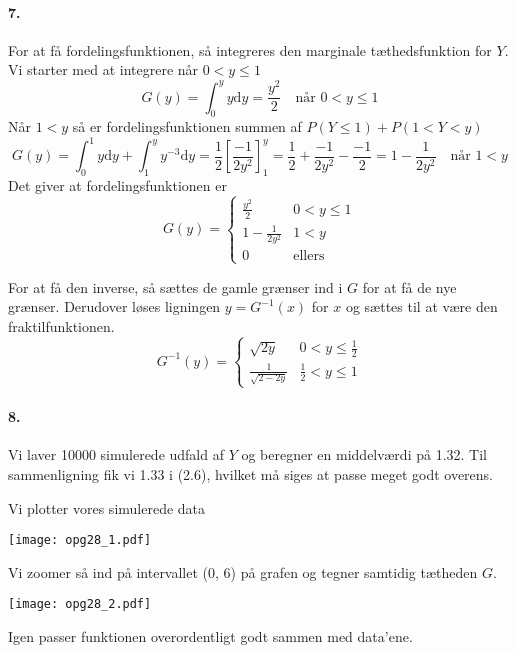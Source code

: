\documentclass[12pt]{article}
\begin{document}
\paragraph{7.}
For at få fordelingsfunktionen, så integreres den marginale tæthedsfunktion for $Y$.
Vi starter med at integrere når $0 < y \leq 1$
\[
    G(y) =
    \int_0^y y \mathrm{d}y = \frac{y^2}{2} \quad \text{når } 0 < y \leq 1
\]
Når $1 < y$ så er fordelingsfunktionen summen af $P(Y \leq 1) + P(1 < Y < y)$
\[
    G(y) =
    \int_0^1 y \mathrm{d}y + \int_1^y y^{-3} \mathrm{d}y = \frac{1}{2}\left[ \frac{-1}{2y^2} \right]_1^y = \frac{1}{2} + \frac{-1}{2y^2} - \frac{-1}{2} = 1-\frac{1}{2y^2}
    \quad \text{når } 1 < y
\]
Det giver at fordelingsfunktionen er
\[
    G(y) =
    \begin{cases}
        \frac{y^2}{2} & 0<y\leq 1\\
        1-\frac{1}{2y^2} & 1 < y \\
        0 &\text{ellers}
    \end{cases}
\]

For at få den inverse, så sættes de gamle grænser ind i $G$ for at få de nye grænser. Derudover løses ligningen $y = G^{-1}(x)$ for $x$ og sættes til at være den fraktilfunktionen.
\[
    G^{-1}(y) =
    \begin{cases}
        \sqrt{2y} & 0 < y \leq \frac{1}{2} \\
        \frac{1}{\sqrt{2-2y}} & \frac{1}{2} < y \leq 1
    \end{cases}
\]

\paragraph{8.}
Vi laver 10000 simulerede udfald af $Y$ og beregner en middelværdi på 1.32. Til sammenligning fik vi 1.33 i (2.6), hvilket må siges at passe meget godt overens.

Vi plotter vores simulerede data
\begin{center}
  \texttt{[image: opg28\_1.pdf]}
\end{center}

Vi zoomer så ind på intervallet (0, 6) på grafen og tegner samtidig tætheden $G$.
\begin{center}
  \texttt{[image: opg28\_2.pdf]}
\end{center}

Igen passer funktionen overordentligt godt sammen med data'ene.
\end{document}
